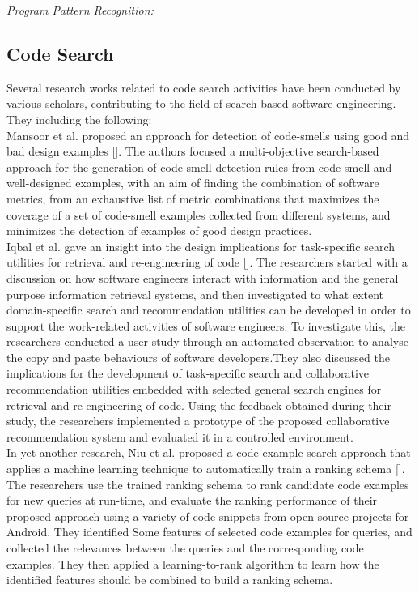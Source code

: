 \documentclass[a4paper]{article}
\begin{document}
\textit{Program Pattern Recognition:}







\subsection{Code Search}
Several research works related to code search activities have been conducted by various scholars, contributing to the field of search-based software engineering. They including the following:\\
Mansoor et al. proposed an approach for detection of code-smells using good and bad design examples [].  The authors focused a multi-objective search-based approach for the generation of code-smell detection rules from code-smell and well-designed examples, with an aim of ﬁnding the combination of software metrics, from an exhaustive list of metric combinations that maximizes the coverage of a set of code-smell examples collected from different systems, and minimizes the detection of examples of good design practices.\\
Iqbal et al. gave an insight into the design implications for task-specific search utilities for retrieval and re-engineering of code []. The researchers started with a discussion on how software engineers interact with information and the general purpose information retrieval systems, and then investigated to what extent domain-specific search and recommendation utilities can be developed in order to support the work-related activities of software engineers. To investigate this, the researchers conducted a user study through an automated observation to analyse the copy and paste behaviours of software developers.They also discussed the implications for the development of task-specific search and collaborative recommendation utilities embedded with selected general search engines for retrieval and re-engineering of code. Using the feedback obtained during their study, the researchers implemented a prototype of the proposed collaborative recommendation system and evaluated it in a controlled environment.\\
In yet another research, Niu et al. proposed a code example search approach that applies a machine learning technique to automatically train a ranking schema []. The researchers use the trained ranking schema to rank candidate code examples for new queries at run-time, and evaluate the ranking performance of their proposed approach using a variety of code snippets from open-source projects for Android. They identified Some features of selected code examples for queries, and collected the relevances between the queries and the corresponding code examples. They then applied a learning-to-rank algorithm to learn how the identified features should be combined to build a ranking schema.\\
\end{document}

